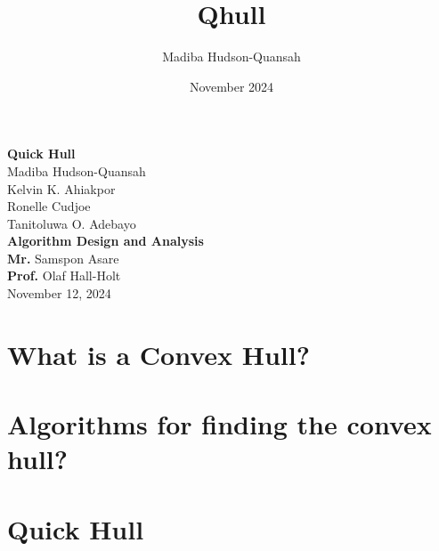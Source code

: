 \documentclass[12pt]{article}
\title{Qhull}
\author{Madiba Hudson-Quansah}
\date{November 2024}
\begin{document}
\begin{titlepage}
  \begin{center}


    \textbf{Quick Hull} \\



    Madiba Hudson-Quansah \\
    Kelvin K. Ahiakpor \\
    Ronelle Cudjoe \\
    Tanitoluwa O. Adebayo \\

    \textbf{Algorithm Design and Analysis} \\
    \textbf{Mr.} Samspon Asare \\
    \textbf{Prof.} Olaf Hall-Holt\\
    November 12, 2024 \\


  \end{center}
\end{titlepage}

\section{What is a Convex Hull?}
\section{Algorithms for finding the convex hull?}
\section{Quick Hull}
\end{document}
